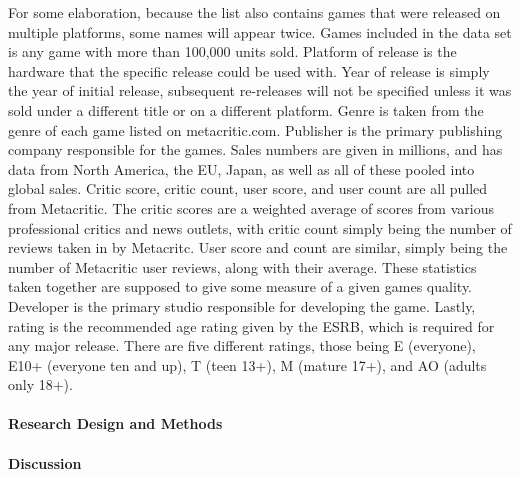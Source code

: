 \documentclass[12pt]{article}
\begin{document}
For some elaboration, because the list also contains games that were released on multiple platforms, some names will appear twice. 
Games included in the data set is any game with more than 100,000 units sold. Platform of release is the hardware that the specific 
release could be used with. Year of release is simply the year of initial release, subsequent re-releases will not be specified unless 
it was sold under a different title or on a different platform. Genre is taken from the genre of each game listed on metacritic.com. 
Publisher is the primary publishing company responsible for the games. Sales numbers are given in millions, and has data from North 
America, the EU, Japan, as well as all of these pooled into global sales. Critic score, critic count, user score, and user count are 
all pulled from Metacritic. The critic scores are a weighted average of scores from various professional critics and news outlets, with 
critic count simply being the number of reviews taken in by Metacritc. User score and count are similar, simply being the number of 
Metacritic user reviews, along with their average. These statistics taken together are supposed to give some measure of a given games 
quality. Developer is the primary studio responsible for developing the game. Lastly, rating is the recommended age rating given by 
the ESRB, which is required for any major release. There are five different ratings, those being E (everyone), E10+ (everyone ten and up), 
T (teen 13+), M (mature 17+), and AO (adults only 18+).


\paragraph{Research Design and Methods}




\paragraph{Discussion}





\end{document}
